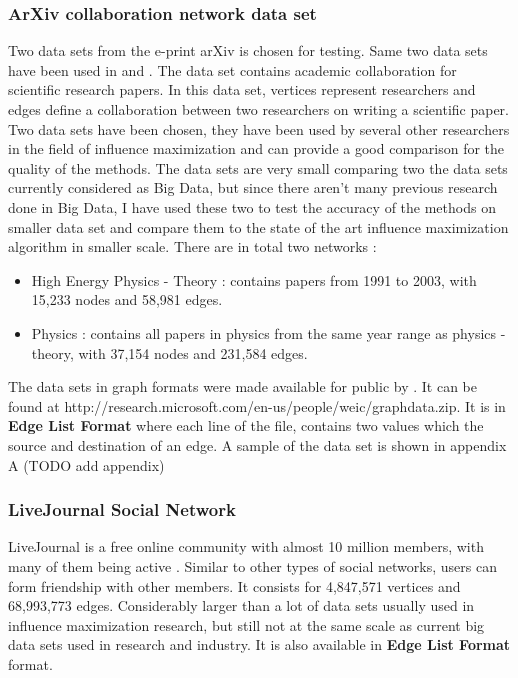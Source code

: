 \documentclass[english]{tktltiki}
\begin{document}
\subsubsection{ArXiv collaboration network data set}
Two data sets from the e-print arXiv is chosen for testing. Same two data sets have been used in \cite{kempe03} and \cite{chen09}. The data set contains academic collaboration for scientific research papers. In this data set, vertices represent researchers and edges define a collaboration between two researchers on writing a scientific paper. Two data sets have been chosen, they have been used by several other researchers in the field of influence maximization and can provide a good comparison for the quality of the methods. The data sets are very small comparing two the data sets currently considered as Big Data, but since there aren't many previous research done in Big Data, I have used these two to test the accuracy of the methods on smaller data set and compare them to the state of the art influence maximization algorithm in smaller scale. There are in total two networks : 
\begin{itemize}
\item High Energy Physics - Theory : contains papers from 1991 to 2003, with 15,233 nodes and 58,981 edges.
\item Physics : contains all papers in  physics from the same year range as physics - theory, with 37,154 nodes and 231,584 edges.
\end{itemize}
The data sets in graph formats were made available for public by \cite{chen09}. It can be found at http://research.microsoft.com/en-us/people/weic/graphdata.zip. It is in \textbf{Edge List Format} where each line of the file, contains two values which the source and destination of an edge. A sample of the data set is shown in appendix A (TODO add appendix)

\subsubsection{LiveJournal Social Network}
LiveJournal is a free online community with almost 10 million members, with many of them being active . Similar to other types of social networks, users can form friendship with other members. It consists for 4,847,571 vertices and 68,993,773 edges. Considerably larger than a lot of data sets usually used in influence maximization research, but still not at the same scale as current big data sets used in research and industry.  It is also available in \textbf{Edge List Format} format.
\end{document}
